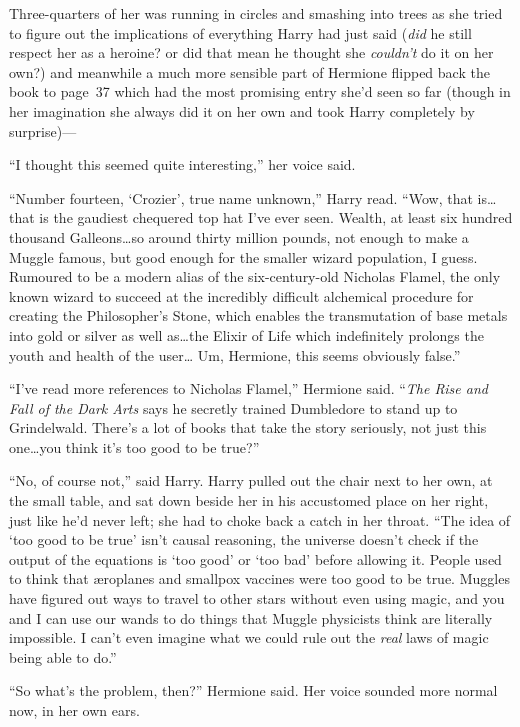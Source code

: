 Three-quarters of her was running in circles and smashing into trees as she tried to figure out the implications of everything Harry had just said (\emph{did} he still respect her as a heroine? or did that mean he thought she \emph{couldn’t} do it on her own?) and meanwhile a much more sensible part of Hermione flipped back the book to page~37 which had the most promising entry she’d seen so far (though in her imagination she always did it on her own and took Harry completely by surprise)—

“I thought this seemed quite interesting,” her voice said.

“Number fourteen, ‘Crozier’, true name unknown,” Harry read. “Wow, that is…that is the gaudiest chequered top hat I’ve ever seen. Wealth, at least six hundred thousand Galleons…so around thirty million pounds, not enough to make a Muggle famous, but good enough for the smaller wizard population, I guess. Rumoured to be a modern alias of the six-century-old Nicholas Flamel, the only known wizard to succeed at the incredibly difficult alchemical procedure for creating the Philosopher’s Stone, which enables the transmutation of base metals into gold or silver as well as…the Elixir of Life which indefinitely prolongs the youth and health of the user… Um, Hermione, this seems obviously false.”

“I’ve read more references to Nicholas Flamel,” Hermione said. “\emph{The Rise and Fall of the Dark Arts} says he secretly trained Dumbledore to stand up to Grindelwald. There’s a lot of books that take the story seriously, not just this one…you think it’s too good to be true?”

“No, of course not,” said Harry. Harry pulled out the chair next to her own, at the small table, and sat down beside her in his accustomed place on her right, just like he’d never left; she had to choke back a catch in her throat. “The idea of ‘too good to be true’ isn’t causal reasoning, the universe doesn’t check if the output of the equations is ‘too good’ or ‘too bad’ before allowing it. People used to think that æroplanes and smallpox vaccines were too good to be true. Muggles have figured out ways to travel to other stars without even using magic, and you and I can use our wands to do things that Muggle physicists think are literally impossible. I can’t even imagine what we could rule out the \emph{real} laws of magic being able to do.”

“So what’s the problem, then?” Hermione said. Her voice sounded more normal now, in her own ears.

